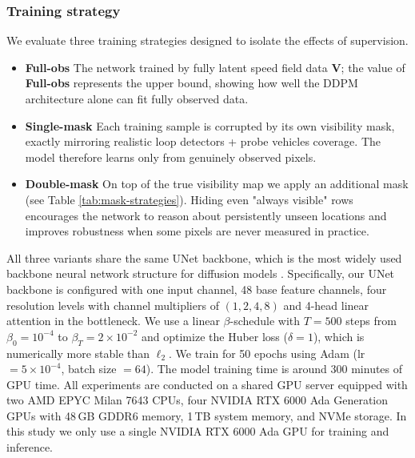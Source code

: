 \documentclass[a4paper,fleqn]{cas-sc}
\numberwithin{equation}{section}
\begin{document}
\subsubsection{Training strategy}
\label{exp:training}
We evaluate three training strategies designed to isolate the effects of supervision.
\begin{itemize}
    \item  \textbf{Full-obs} The network trained by fully latent speed field data $\mathbf V$; the value of \textbf{Full-obs} represents the upper bound, showing how well the DDPM architecture alone can fit fully observed data.
    \item \textbf{Single-mask} Each training sample is corrupted by its own visibility mask, exactly mirroring realistic loop detectors + probe vehicles coverage. The model therefore learns only from genuinely observed pixels.
    \item \textbf{Double-mask} On top of the true visibility map we apply an additional mask (see Table \ref{tab:mask-strategies}). Hiding even "always visible" rows encourages the network to reason about persistently unseen locations and improves robustness when some pixels are never measured in practice.
\end{itemize}
All three variants share the same UNet backbone, which is the most widely used backbone neural network structure for diffusion models \citep{ronneberger2015u, ho2020denoising}.
Specifically, our UNet backbone is configured with one input channel, 48 base feature channels, four resolution levels with channel multipliers of $ (1, 2, 4, 8)$ and 4-head linear attention in the bottleneck.
We use a linear $\beta$-schedule with $T{=}500$ steps from $\beta_0=10^{-4}$ to $\beta_T=2{\times}10^{-2}$ and optimize the Huber loss ($\delta=1$), which is numerically more stable than $\ell_2$.
We train for 50 epochs using Adam (lr $=5\!\times\!10^{-4}$, batch size $=64$). The model training time is around 300 minutes of GPU time. All experiments are conducted on a shared GPU server equipped with two AMD EPYC Milan 7643 CPUs, four NVIDIA RTX 6000 Ada Generation GPUs with 48\,GB GDDR6 memory, 1\,TB system memory, and NVMe storage. In this study we only use a single NVIDIA RTX 6000 Ada GPU for training and inference.


\end{document}
